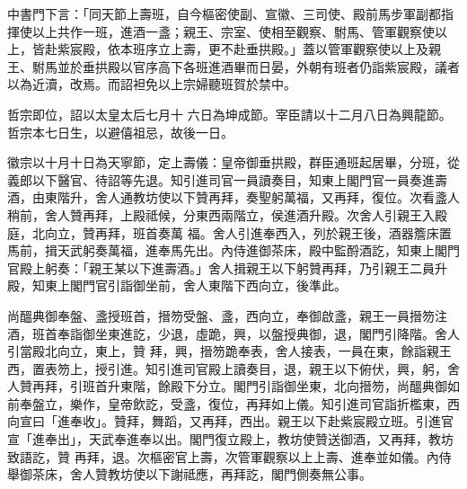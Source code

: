 \begin{pinyinscope}
 中書門下言：「同天節上壽班，自今樞密使副、宣徽、三司使、殿前馬步軍副都指揮使以上共作一班，進酒一盞；親王、宗室、使相至觀察、駙馬、管軍觀察使以上，皆赴紫宸殿，依本班序立上壽，更不赴垂拱殿。」蓋以管軍觀察使以上及親王、駙馬並於垂拱殿以官序高下各班進酒畢而日晏，外朝有班者仍詣紫宸殿，議者以為近瀆，改焉。而詔袒免以上宗婦聽班賀於禁中。



 哲宗即位，詔以太皇太后七月十
 六日為坤成節。宰臣請以十二月八日為興龍節。哲宗本七日生，以避僖祖忌，故後一日。



 徽宗以十月十日為天寧節，定上壽儀：皇帝御垂拱殿，群臣通班起居畢，分班，從義郎以下醫官、待詔等先退。知引進司官一員讀奏目，知東上閣門官一員奏進壽酒，由東階升，舍人通教坊使以下贊再拜，奏聖躬萬福，又再拜，復位。次看盞人稍前，舍人贊再拜，上殿祗候，分東西兩階立，侯進酒升殿。次舍人引親王入殿庭，北向立，贊再拜，班首奏萬
 福。舍人引進奉西入，列於親王後，酒器簷床置馬前，揖天武躬奏萬福，進奉馬先出。內侍進御茶床，殿中監酹酒訖，知東上閣門官殿上躬奏：「親王某以下進壽酒。」舍人揖親王以下躬贊再拜，乃引親王二員升殿，知東上閣門官引詣御坐前，舍人東階下西向立，後準此。



 尚醞典御奉盤、盞授班首，搢笏受盤、盞，西向立，奉御啟盞，親王一員搢笏注酒，班首奉詣御坐東進訖，少退，虛跪，興，以盤授典御，退，閣門引降階。舍人引當殿北向立，東上，贊
 拜，興，搢笏跪奉表，舍人接表，一員在東，餘詣親王西，置表笏上，授引進。知引進司官殿上讀奏目，退，親王以下俯伏，興，躬，舍人贊再拜，引班首升東階，餘殿下分立。閣門引詣御坐東，北向搢笏，尚醞典御如前奉盤立，樂作，皇帝飲訖，受盞，復位，再拜如上儀。知引進司官詣折檻東，西向宣曰「進奉收」。贊拜，舞蹈，又再拜，西出。親王以下赴紫宸殿立班。引進官宣「進奉出」，天武奉進奉以出。閣門復立殿上，教坊使贊送御酒，又再拜，教坊致語訖，贊
 再拜，退。次樞密官上壽，次管軍觀察以上上壽、進奉並如儀。內侍舉御茶床，舍人贊教坊使以下謝祗應，再拜訖，閣門側奏無公事。




\end{pinyinscope}
